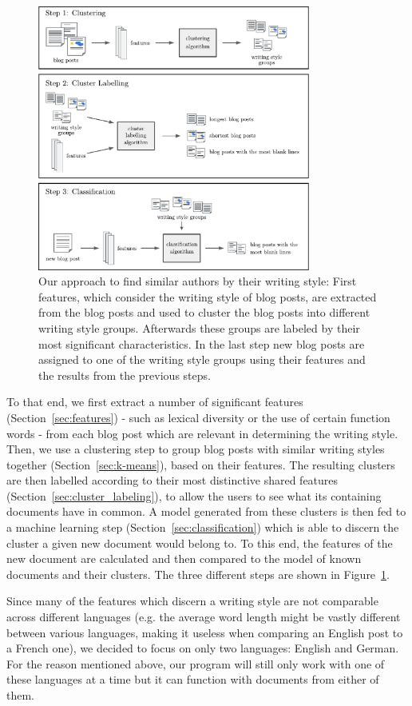 \begin{figure}[h]
    \centering
    \includegraphics[width=0.8\textwidth]{images/Figure_1.pdf}
    \caption{Our approach to find similar authors by their writing style: First features, which consider the writing style of blog posts, are extracted from the blog posts and used to cluster the blog posts into different writing style groups. Afterwards these groups are labeled by their most significant characteristics. In the last step new blog posts are assigned to one of the writing style groups using their features and the results from the previous steps.}
    \label{fig:figure_1}
\end{figure}

To that end, we first extract a number of significant features (Section~\ref{sec:features}) - such as lexical diversity or the use of certain function words - from each blog post which are relevant in determining the writing style.
Then, we use a clustering step to group blog posts with similar writing styles together (Section~\ref{sec:k-means}), based on their features.
The resulting clusters are then labelled according to their most distinctive shared features (Section~\ref{sec:cluster_labeling}), to allow the users to see what its containing documents have in common.
A model generated from these clusters is then fed to a machine learning step (Section~\ref{sec:classification}) which is able to discern the cluster a given new document would belong to.
To this end, the features of the new document are calculated and then compared to the model of known documents and their clusters.
The three different steps are shown in Figure~\ref{fig:figure_1}.


Since many of the features which discern a writing style are not comparable across different languages (e.g. the average word length might be vastly different between various languages, making it useless when comparing an English post to a French one), we decided to focus on only two languages: English and German.
For the reason mentioned above, our program will still only work with one of these languages at a time but it can function with documents from either of them.
